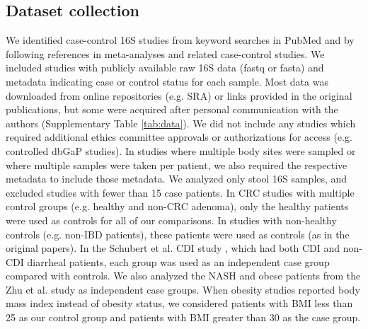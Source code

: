 \subsection*{Dataset collection}
We identified case-control 16S studies from keyword searches in PubMed and by following references in meta-analyses and related case-control studies.
We included studies with publicly available raw 16S data (fastq or fasta) and metadata indicating case or control status for each sample.
Most data was downloaded from online repositories (e.g. SRA) or links provided in the original publications, but some were acquired after personal communication with the authors (Supplementary Table \ref{tab:data}).
We did not include any studies which required additional ethics committee approvals or authorizations for access (e.g. controlled dbGaP studies).
In studies where multiple body sites were sampled or where multiple samples were taken per patient, we also required the respective metadata to include those metadata.
We analyzed only stool 16S samples, and excluded studies with fewer than 15 case patients.
In CRC studies with multiple control groups (e.g. healthy and non-CRC adenoma), only the healthy patients were used as controls for all of our comparisons.
In studies with non-healthy controls (e.g. non-IBD patients), these patients were used as controls (as in the original papers).
In the Schubert et al. CDI study \cite{cdi-schubert}, which had both CDI and non-CDI diarrheal patients, each group was used as an independent case group compared with controls.
We also analyzed the NASH and obese patients from the Zhu et al. study \cite{nash-baker} as independent case groups.
When obesity studies reported body mass index instead of obesity status, we considered patients with BMI less than 25 as our control group and patients with BMI greater than 30 as the case group.


